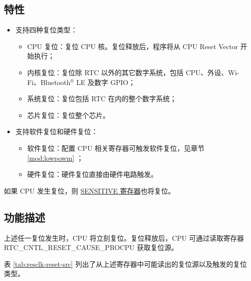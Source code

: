 \documentclass[main\_\_CN.tex]{subfiles}
\begin{document}
\subsection{特性}
\begin{itemize}
    \item 支持四种复位类型：
    \begin{itemize}
    \item CPU 复位：复位 CPU 核。复位释放后，程序将从 CPU Reset Vector 开始执行；
    \item 内核复位：复位除 RTC 以外的其它数字系统，包括 CPU、外设、Wi-Fi、Bluetooth$^®$ LE 及数字 GPIO；
    \item 系统复位：复位包括 RTC 在内的整个数字系统；
    \item 芯片复位：复位整个芯片。
    \end{itemize}
    \item 支持软件复位和硬件复位：
    \begin{itemize}
        \item 软件复位：配置 CPU 相关寄存器可触发软件复位，见章节 \ref{mod:lowpowm} \textit{}；
        \item 硬件复位：硬件复位直接由硬件电路触发。
    \end{itemize}
\end{itemize}
\begin{tiplisting}
如果 CPU 发生复位，则 \href{https://github.com/espressif/esp-idf/blob/master/components/soc/esp32c2/register/soc/sensitive_reg.h}{SENSITIVE 寄存器}也将复位。
\end{tiplisting}

\subsection{功能描述}
上述任一复位发生时，CPU 将立刻复位。复位释放后，CPU 可通过读取寄存器 RTC\_CNTL\_RESET\_CAUSE\_PROCPU 获取复位源。

表 \ref{tab:resclk-reset-src} 列出了从上述寄存器中可能读出的复位源以及触发的复位类型。
\end{document}
